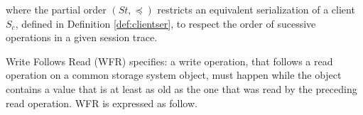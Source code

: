 \documentclass{sig-alternate-05-2015}
\begin{document}
\begin{align}
\begin{split}
 \end{split}
  \end{align} where the partial order $\left( \mathit{St}, \preccurlyeq \right)$ restricts an equivalent serialization of a client $S_c$, defined in Definition \ref{def:clientser}, to respect the order of sucessive operations in a given session trace. %
  \par Write Follows Read (WFR) specifies: a write operation, that follows a read operation on a common storage system object, must happen while the object contains a value that is at least as old as the one  that was read by the preceding read operation. WFR is expressed as follow. \\
\end{document}
